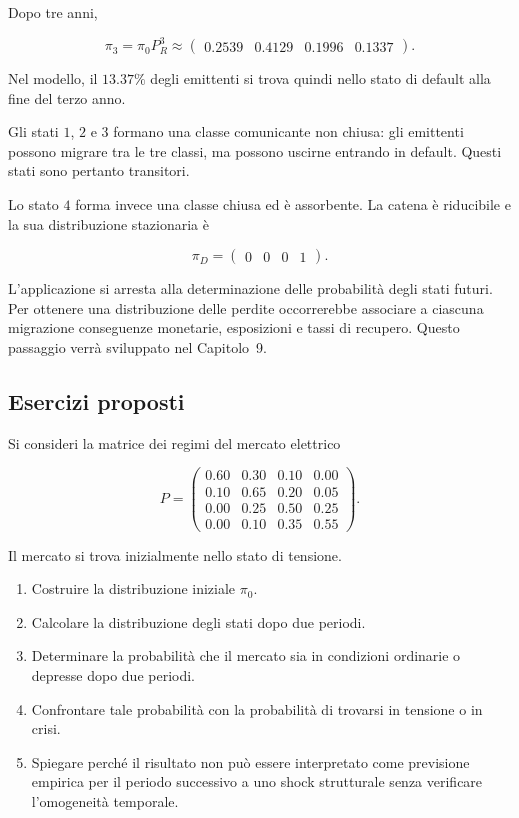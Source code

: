 Dopo tre anni,

\[
\pi_3
=
\pi_0P_R^3
\approx
\begin{pmatrix}
0.2539&0.4129&0.1996&0.1337
\end{pmatrix}.
\]

Nel modello, il \(13.37\%\) degli emittenti si trova quindi nello stato
di default alla fine del terzo anno.

Gli stati \(1\), \(2\) e \(3\) formano una classe comunicante non
chiusa: gli emittenti possono migrare tra le tre classi, ma possono
uscirne entrando in default. Questi stati sono pertanto transitori.

Lo stato \(4\) forma invece una classe chiusa ed \`{e} assorbente. La
catena \`{e} riducibile e la sua distribuzione stazionaria \`{e}

\[
\pi_D
=
\begin{pmatrix}
0&0&0&1
\end{pmatrix}.
\]

L'applicazione si arresta alla determinazione delle probabilit\`{a}
degli stati futuri. Per ottenere una distribuzione delle perdite
occorrerebbe associare a ciascuna migrazione conseguenze monetarie,
esposizioni e tassi di recupero. Questo passaggio verr\`{a} sviluppato
nel Capitolo~9.

\subsection{Esercizi proposti}

\begin{exercise}
Si consideri la matrice dei regimi del mercato elettrico

\[
P=
\begin{pmatrix}
0.60 & 0.30 & 0.10 & 0.00\\
0.10 & 0.65 & 0.20 & 0.05\\
0.00 & 0.25 & 0.50 & 0.25\\
0.00 & 0.10 & 0.35 & 0.55
\end{pmatrix}.
\]

Il mercato si trova inizialmente nello stato di tensione.

\begin{enumerate}

\item Costruire la distribuzione iniziale \(\pi_0\).

\item Calcolare la distribuzione degli stati dopo due periodi.

\item Determinare la probabilit\`{a} che il mercato sia in condizioni
ordinarie o depresse dopo due periodi.

\item Confrontare tale probabilit\`{a} con la probabilit\`{a} di
trovarsi in tensione o in crisi.

\item Spiegare perch\'{e} il risultato non pu\`{o} essere interpretato
come previsione empirica per il periodo successivo a uno shock
strutturale senza verificare l'omogeneit\`{a} temporale.
\end{enumerate}
\end{exercise}

